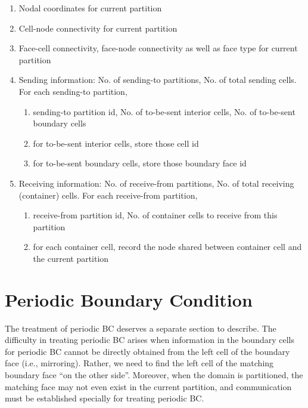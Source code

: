 \documentclass[12pt, letterpaper]{report}
\begin{document}
\begin{enumerate}
   \item Nodal coordinates for current partition
   \item Cell-node connectivity for current partition
   \item Face-cell connectivity, face-node connectivity as well as face type for current partition
   \item Sending information: No. of sending-to partitions, No. of total sending cells. For each
      sending-to partition,
      \begin{enumerate}
         \item sending-to partition id, No. of to-be-sent interior cells, No. of to-be-sent boundary cells
         \item for to-be-sent interior cells, store those cell id
         \item for to-be-sent boundary cells, store those boundary face id
      \end{enumerate}
   \item Receiving information: No. of receive-from partitions, No. of total receiving (container)
      cells. For each receive-from partition, 
      \begin{enumerate}
         \item receive-from partition id, No. of container cells to receive from this partition
         \item for each container cell, record the node shared between container cell and the
            current partition
      \end{enumerate}
\end{enumerate}
\paraspace

\clearpage
\section{Periodic Boundary Condition} \label{c1s4}

The treatment of periodic BC deserves a separate section to describe. The difficulty in treating
periodic BC arises when information in the boundary cells for periodic BC cannot be directly
obtained from the left cell of the boundary face (i.e., mirroring). Rather, we need to find the left
cell of the matching boundary face ``on the other side''. Moreover, when the domain is partitioned,
the matching face may not even exist in the current partition, and communication must be established
specially for treating periodic BC.
\paraspace
\end{document}
